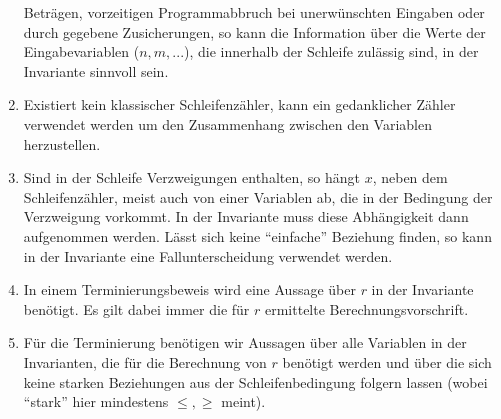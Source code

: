 \documentclass[a4paper,8pt,landscape]{extarticle}
\begin{document}
\begin{multicols*}{3}
\begin{enumerate}
Beträgen, vorzeitigen Programmabbruch bei unerwünschten
Eingaben oder durch gegebene Zusicherungen, so kann die
Information über die Werte der Eingabevariablen ($n, m, ...$), die
innerhalb der Schleife zulässig sind, in der Invariante sinnvoll sein.
      \item Existiert kein klassischer Schleifenzähler, kann ein gedanklicher
Zähler verwendet werden um den Zusammenhang zwischen den
Variablen herzustellen.
      \item Sind in der Schleife Verzweigungen enthalten, so hängt $x$, neben
dem Schleifenzähler, meist auch von einer Variablen ab, die in der
Bedingung der Verzweigung vorkommt. In der Invariante muss
diese Abhängigkeit dann aufgenommen werden. Lässt sich keine
“einfache” Beziehung finden, so kann in der Invariante eine
Fallunterscheidung verwendet werden.
      \item In einem Terminierungsbeweis wird eine Aussage über $r$ in der
Invariante benötigt. Es gilt dabei immer die für $r$ ermittelte
Berechnungsvorschrift.
      \item Für die Terminierung benötigen wir Aussagen über alle Variablen in
der Invarianten, die für die Berechnung von $r$ benötigt werden und
über die sich keine starken Beziehungen aus der Schleifenbedingung
folgern lassen (wobei “stark” hier mindestens $\leq, \geq$ meint).
    \end{enumerate}

    
  \end{multicols*}
\end{document}

